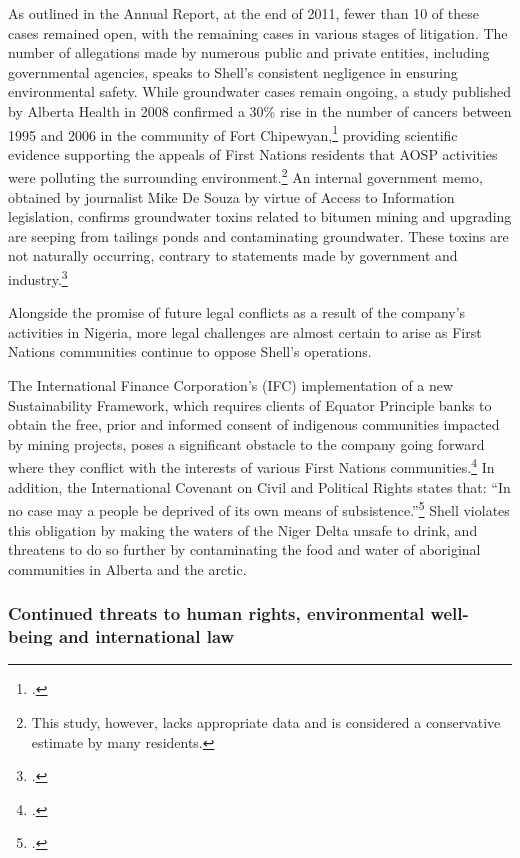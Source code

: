 \begin{description}
As outlined in the Annual Report, at the end of 2011, fewer than 10 of these cases remained open, with the remaining cases in various stages of litigation. The number of allegations made by numerous public and private entities, including governmental agencies, speaks to Shell's consistent negligence in ensuring environmental safety. While groundwater cases remain ongoing, a study published by Alberta Health in 2008 confirmed a 30\% rise in the number of cancers between 1995 and 2006 in the community of Fort Chipewyan,\footcite[][]{RiskingRuin_2012} providing scientific evidence supporting the appeals of First Nations residents that AOSP activities were polluting the surrounding environment.\footnote{This study, however, lacks appropriate data and is considered a conservative estimate by many residents.} An internal government memo, obtained by journalist Mike De Souza by virtue of Access to Information legislation, confirms groundwater toxins related to bitumen mining and upgrading are seeping from tailings ponds and contaminating groundwater. These toxins are not naturally occurring, contrary to statements made by government and industry.\footcite[][]{Memorandum_2012} 
\end{description}


Alongside the promise of future legal conflicts as a result of the company's activities in Nigeria, more legal challenges are almost certain to arise as First Nations communities continue to oppose Shell's operations. 



The International Finance Corporation's (IFC) implementation of a new Sustainability Framework, which requires clients of Equator Principle banks to obtain the free, prior and informed consent of indigenous communities impacted by mining projects, poses a significant obstacle to the company going forward where they conflict with the interests of various First Nations communities.\footcite[][]{Sosa_2011}
In addition, the International Covenant on Civil and Political Rights states that: ``In no case may a people be deprived of its own means of subsistence.''\footcite[Part I, Article I (2)][]{CivilAndPolitical}
Shell violates this obligation by making the waters of the Niger Delta unsafe to drink, and threatens to do so further by contaminating the food and water of aboriginal communities in Alberta and the arctic.


	\subsubsection{Continued threats to human rights, environmental well-being and international law}
	

